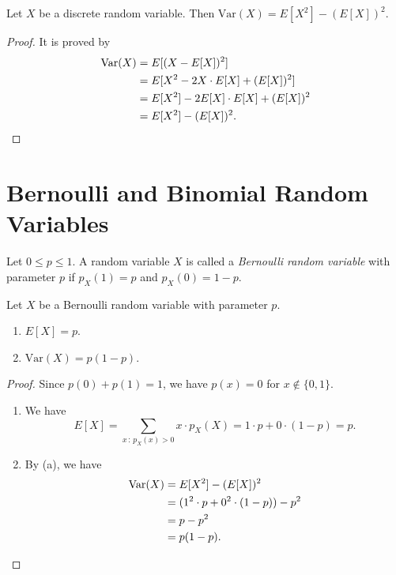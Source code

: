 \begin{theorem}
  Let $X$ be a discrete random variable.
  Then $\mathrm{Var}(X) = E[X^2] - (E[X])^2$.
\end{theorem}
\begin{proof}
  It is proved by
  \begin{align*}
    \mathrm{Var}(X)
    &= E[(X - E[X])^2] \\
    &= E[X^2 - 2X \cdot E[X] + (E[X])^2] \\
    &= E[X^2] - 2E[X] \cdot E[X] + (E[X])^2 \\
    &= E[X^2] - (E[X])^2. \qedhere
  \end{align*}
\end{proof}

\section{Bernoulli and Binomial Random Variables}
\begin{definition}
  Let $0 \leq p \leq 1$.
  A random variable $X$ is called a \emph{Bernoulli random variable} with
  parameter $p$ if $p_X(1) = p$ and $p_X(0) = 1 - p$.
\end{definition}

\begin{theorem}
  Let $X$ be a Bernoulli random variable with parameter $p$.
  \begin{enumerate}
    \item $E[X] = p$.
    \item $\mathrm{Var}(X) = p(1 - p)$.
  \end{enumerate}
\end{theorem}
\begin{proof}
  Since $p(0) + p(1) = 1$, we have $p(x) = 0$ for $x \notin \{0, 1\}$.
  \begin{enumerate}
    \item We have
      \begin{equation*}
        E[X] = \sum_{x\,:\,p_X(x) > 0} x \cdot p_X(X)
             = 1 \cdot p + 0 \cdot (1 - p)
             = p.
      \end{equation*}
    \item By (a), we have
      \begin{align*}
        \mathrm{Var}(X)
        &= E[X^2] - (E[X])^2 \\
        &= (1^2 \cdot p + 0^2 \cdot (1-p)) - p^2 \\
        &= p - p^2 \\
        &= p(1-p). \qedhere
      \end{align*}
  \end{enumerate}
\end{proof}

